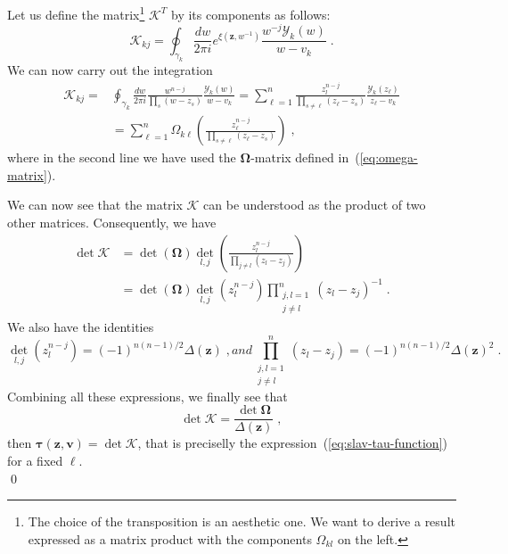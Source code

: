 \documentclass[a4paper,12pt]{amsart}
\begin{document}
Let us define the matrix\footnote{
The choice of the transposition is an aesthetic one. We want 
to derive a result expressed as a matrix product with the components \(\Omega_{kl}\) on the left.}
\(\bm{\mathcal{K}}^T\) by its components as follows:
\begin{equation}
\label{eq:k-matrix}
    \mathcal{K}_{kj} = 
\oint_{\gamma_k} \frac{d w}{2\pi i} e^{\xi(\bm{z}, w^{-1})} \frac{w^{-j}\mathcal{Y}_k(w)}{w - v_k}\; .
\end{equation}
We can now carry out the integration
\begin{equation}
  \begin{split}
    \mathcal{K}_{kj}
    = & \oint_{\gamma_k} \frac{d w}{2\pi i} \frac{w^{n-j}}{\prod_{s} (w - z_s)}
    \frac{\mathcal{Y}_k(w)}{w - v_k} = \sum_{\ell =1}^n \frac{z_l^{n-j}}{\prod_{s\neq \ell} (z_\ell - z_s)}
    \frac{\mathcal{Y}_k(z_\ell)}{z_\ell - v_k}\\
    & = \sum_{\ell = 1}^n  \Omega_{k \ell} \left( \frac{z_\ell^{n-j}}{\prod_{s\neq \ell} (z_\ell - z_s)} \right)\; ,
  \end{split}
\end{equation}
where in the second line we have used the \(\bm{\Omega}\)-matrix
defined in~(\ref{eq:omega-matrix}).

We can now see that the matrix \(\bm{\mathcal{K}}\) can be understood
as the product of two other matrices. Consequently, we have
\begin{equation}
  \begin{split}
  \det \bm{\mathcal{K}} & = \det(\bm{\Omega}) \det_{l,j}\left( \frac{z_l^{n-j}}{\prod_{j\neq l} (z_l - z_j)}\right) \\
  & = \det(\bm{\Omega}) \det_{l, j}(z_l^{n-j}) \prod_{\substack{j, l =1 \\ j \neq l}}^n (z_l - z_j)^{-1} \; .
  \end{split}
\end{equation}
We also have the identities 
\begin{subequations}
  \begin{equation}
	\det_{l,j}(z_l^{n-j}) = (-1)^{n(n-1)/2} \Delta(\bm{z})\; ,
  \end{equation}
  and
  \begin{equation}
	\prod_{\substack{j, l = 1 \\ j \neq l}}^n (z_l - z_j) = (-1)^{n(n-1)/2} \Delta(\bm{z})^2\; . 
  \end{equation}
\end{subequations}
Combining all these expressions, we finally see that
\begin{equation}
  \det \bm{\mathcal{K}} = \frac{\det \bm{\Omega}}{\Delta(\bm{z})}\; ,
\end{equation}
then \(\bm{\tau}(\bm{z}, \bm{v}) = \det\bm{\mathcal{K}}\), that is
preciselly the expression~(\ref{eq:slav-tau-function}) for a fixed
\(\ell\). \\ \qed
\end{document}
